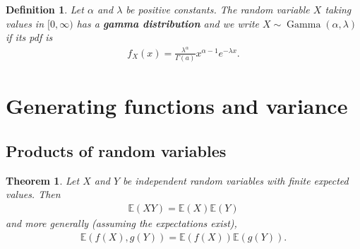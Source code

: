 \documentclass{article}
\theoremstyle{sltheorem}
\newtheorem{definition}{Definition}[section]
\newtheorem{theorem}{Theorem}[section]
\newcommand{\E}{\mathbb{E}}
\DeclareMathOperator{\GD}{Gamma}
\newcommand*\B[1]{\textbf{#1}}
\begin{document}
\begin{definition}
    Let $\alpha$ and $\lambda$ be positive constants. The random variable
    $X$ taking values in $[0,\infty)$ has a \B{gamma distribution} and we 
    write $X\sim\GD(\alpha, \lambda)$ if its pdf is
    \begin{align*}
        f_X(x) = \frac{\lambda^\alpha}{\Gamma(a)}x^{\alpha-1}e^{-\lambda x}.
    \end{align*}
\end{definition}
\section{Generating functions and variance}
\subsection{Products of random variables}
\begin{theorem}
    Let $X$ and $Y$ be \emph{independent} random variables with finite expected values.
    Then
    \begin{align*}
        \E(XY) = \E(X)\E(Y)
    \end{align*}
    and more generally (assuming the expectations exist),
    \begin{align*}
        \E(f(X), g(Y)) = \E(f(X))\E(g(Y)).
    \end{align*}
\end{theorem}
\end{document}
